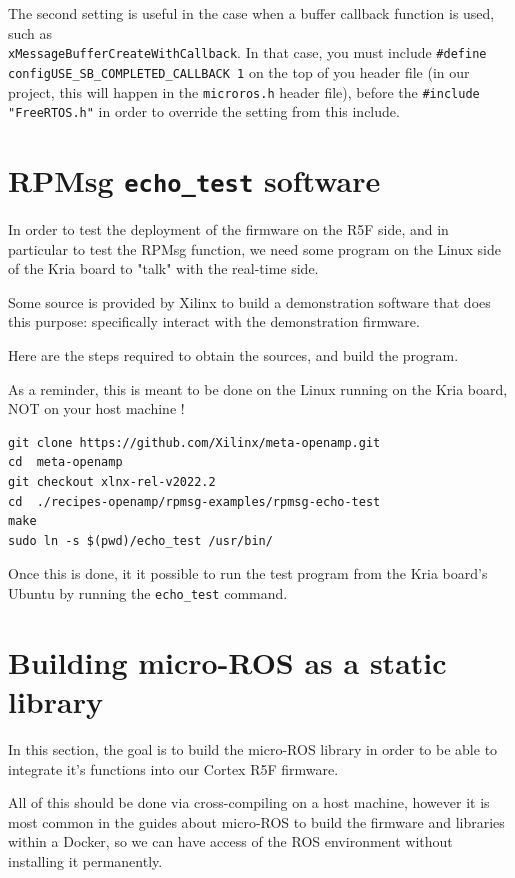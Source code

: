 \documentclass[10pt]{article}
\begin{document}
\pagebreak
The second setting is useful in the case when a buffer callback function is used, such as\\[0pt]
\texttt{xMessageBufferCreateWithCallback}.
In that case, you must include \texttt{\#define configUSE\_SB\_COMPLETED\_CALLBACK 1} on the top of you header
file (in our project, this will happen in the \texttt{microros.h} header file),
before the \texttt{\#include "FreeRTOS.h"} in order to override the setting from this include.


\pagebreak
\section{RPMsg \texttt{echo\_test} software}
\label{sec:org3b96527}
In order to test the deployment of the firmware on the R5F side, and in particular
to test the RPMsg function, we need some program on the Linux side of the Kria
board to "talk" with the real-time side.

Some source is provided by Xilinx to build a demonstration software that does
this purpose: specifically interact with the demonstration firmware.

Here are the steps required to obtain the sources, and build the program.

As a reminder, this is meant to be done on the Linux running on the
Kria board, NOT on your host machine !

\begin{verbatim}
git clone https://github.com/Xilinx/meta-openamp.git
cd  meta-openamp
git checkout xlnx-rel-v2022.2
cd  ./recipes-openamp/rpmsg-examples/rpmsg-echo-test
make
sudo ln -s $(pwd)/echo_test /usr/bin/
\end{verbatim}

Once this is done, it it possible to run the test program from the Kria board's Ubuntu
by running the \texttt{echo\_test} command.

\section{Building micro-ROS as a static library}
\label{sec:orgb0f1790}
In this section, the goal is to build the micro-ROS library in order to be
able to integrate it's functions into our Cortex R5F firmware.

All of this should be done via cross-compiling on a host machine, however
it is most common in the guides about micro-ROS to build the firmware and libraries within a Docker,
so we can have access of the ROS environment without installing it permanently.
\end{document}
